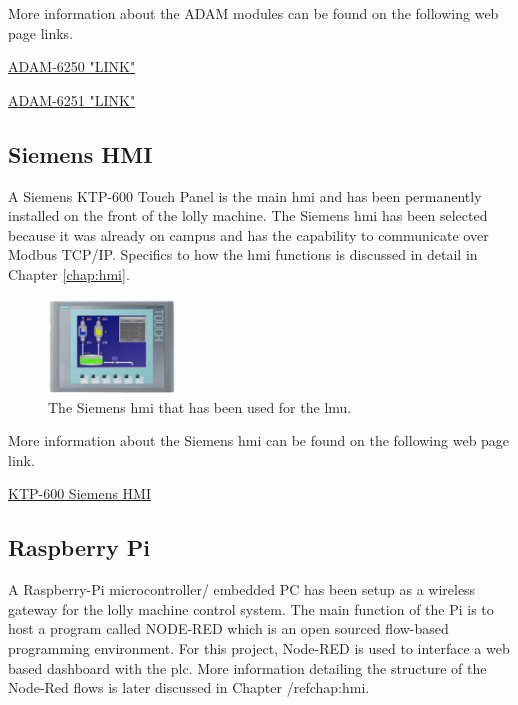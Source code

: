         More information about the ADAM modules can be found on the following web page links.
        
        \href{https://www.advantech.com/en-au/products/7447e150-338d-402d-b5a1-c9ce6d98816e/adam-6250/mod_da940b26-501f-413e-bfbc-732fd7496782}{ADAM-6250 "LINK"} \cite{6250Data} 
    
        \href{https://www.advantech.com/en-au/products/7447e150-338d-402d-b5a1-c9ce6d98816e/adam-6251/mod_98139b28-a181-4c45-83c9-01db52c3db7f}{ADAM-6251 "LINK"} \cite{6251Data} 
        

    \subsection{Siemens HMI}
        A Siemens KTP-600 Touch Panel is the main \acrshort{hmi} and has been permanently installed on the front of the lolly machine. The Siemens \acrshort{hmi} has been selected because it was already on campus and has the capability to communicate over Modbus TCP/IP. Specifics to how the \acrshort{hmi} functions is discussed in detail in Chapter \ref{chap:hmi}.
    
        \begin{figure}[H]
            \centering
            \includegraphics[width = 0.3\textwidth]{2_images/ktp600}
            \caption{The Siemens \acrshort{hmi} that has been used for the \acrshort{lmu}\cite{ktp600Data}.}
            \label{fig:hmi}
        \end{figure}
    
        More information about the Siemens \acrshort{hmi} can be found on the following web page link.
    
        \href{https://support.industry.siemens.com/cs/document/31032678/simatic-hmi-hmi-devices-basic-panels?dti=0&lc=en-WW}{KTP-600 Siemens HMI} \cite{ktp600Data} 
        
    
    \subsection{Raspberry Pi}
    A Raspberry-Pi microcontroller/ embedded PC has been setup as a wireless gateway for the lolly machine control system. The main function of the Pi is to host a program called NODE-RED which is an open sourced flow-based programming environment. For this project, Node-RED is used to interface a web based dashboard with the \acrshort{plc}. More information detailing the structure of the Node-Red flows is later discussed in Chapter /ref{chap:hmi}.
    
